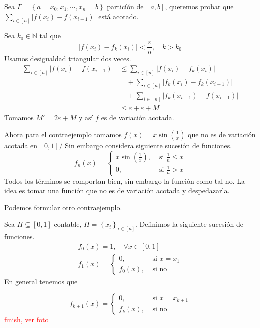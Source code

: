 \documentclass[12pt]{article}
\theoremstyle{plain}
\theoremstyle{definition}
\theoremstyle{remark}
\numberwithin{equation}{section}
\newcommand{\bN}{\mathbb{N}}        %
\renewcommand{\leq}{\leqslant}      %
\renewcommand{\:}{\colon}           %
\newcommand{\conj}[1]{\left\lbrace#1\right\rbrace}
\newcommand{\bonj}[1]{\left\lbrack#1\right\rbrack}
\begin{document}
\begin{multicols}{2}
\begin{ptcbp}
Sea $\Gamma=\conj{a=x_0,x_1,\cdots,x_n=b}$ particíón de $\bonj{a,b}$, queremos probar que $\sum_{i\in\bonj{n}}|f(x_i)-f(x_{i-1})|$ está acotado. \par
Sea $k_0\in\bN$ tal que
$$|f(x_i)-f_k(x_i)|<\frac{\varepsilon}{n},\quad k>k_0$$
Usamos desigualdad triangular dos veces.
\begin{align*}
  \sum_{i\in\bonj{n}}|f(x_i)-f(x_{i-1})| &\leq \sum_{i\in\bonj{n}}|f(x_i)-f_k(x_{i})|\\
  &\quad +\sum_{i\in\bonj{n}}|f_k(x_i)-f_k(x_{i-1})|\\
  &\quad +\sum_{i\in\bonj{n}}|f_k(x_{i-1})-f(x_{i-1})|\\
  &\leq \varepsilon+\varepsilon+M
\end{align*}
Tomamos $M'=2\varepsilon+M$ y así $f$ es de variación acotada.\par
Ahora para el contraejemplo tomamos $f(x)=x\sin(\frac{1}{x})$ que no es de variación acotada en $\bonj{0,1}$/ Sin embargo considera siguiente sucesión de funciones.
$$
f_n(x)=
  \begin{cases}
    x\sin(\frac{1}{x}), & \mbox{ si } \frac{1}{n}\leq x\\
    0, & \text{ si }\frac{1}{n} > x
  \end{cases}
$$
Todos los términos se comportan bien, sin embargo la función como tal no. La idea es tomar una función que no es de variación acotada y despedazarla.

\end{ptcbp}
Podemos formular otro contraejemplo.

\begin{ptcb}
Sea $H\subseteq\bonj{0,1}$ contable, $H=\conj{x_i}_{i\in\bonj{n}}$. Definimos la siguiente sucesión de funciones.
\begin{gather*}
  f_0(x) = 1,\quad\forall x\in\bonj{0,1}\\
  f_1(x)=
  \begin{cases}
    0, & \mbox{ si } x=x_1\\
    f_0(x), & \mbox{ si no}
  \end{cases}
\end{gather*}
En general tenemos que

$$
f_{k+1}(x)=
  \begin{cases}
    0, & \mbox{ si } x=x_{k+1}\\
    f_{k}(x), & \mbox{ si no}
  \end{cases}
$$
\textcolor{red}{finish, ver foto}
\end{ptcb}


\end{multicols}
\end{document}
